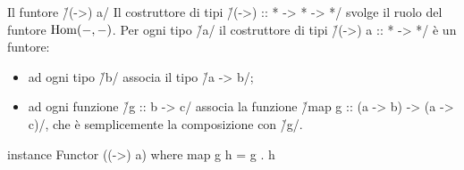 \begin{frame}[fragile]{\secname}{Il funtore \h/(->) a/}
Il costruttore di tipi \h/(->) :: * -> * -> */ svolge il ruolo del funtore $\operatorname{Hom}(-,-)$. Per ogni tipo \h/a/ il costruttore di tipi \h/(->) a :: * -> */ è un funtore:
\begin{itemize}[<+(1)->]
\item ad ogni tipo \h/b/ associa il tipo \h/a -> b/;
\item ad ogni funzione \h/g :: b -> c/ associa la funzione \h/map g :: (a -> b) -> (a -> c)/, che è semplicemente la composizione con \h/g/.
\end{itemize}
\pause

\begin{haskellcode}
instance Functor ((->) a) where
    map g h = g . h
\end{haskellcode}
\end{frame}